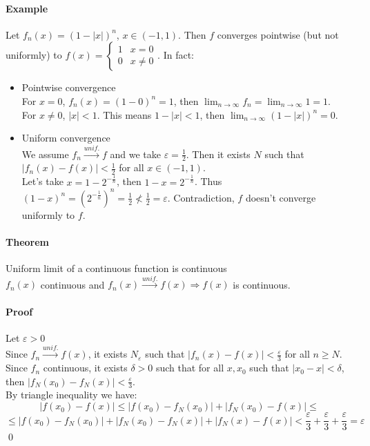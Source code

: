\documentclass{article}
\newcommand{\DS}{\displaystyle}
\newcommand{\abs}[1]{\left|#1\right|}
\newcommand{\limn}{\lim_{n \to \infty}}
\newcommand{\tounif}{\xrightarrow{unif.}}
\newcommand{\intoo}[1]{\left(#1\right)}
\newcommand{\Ep}{\varepsilon}
\newcommand{\Theorem}{\paragraph{Theorem}}
\newcommand{\Proof}{\paragraph{Proof}}
\newcommand{\Example}{\paragraph{Example}}
\begin{document}
  \Example Let $f_n(x) = (1 - \abs{x})^n$, $x \in \intoo{-1,1}$. Then $f$
  converges pointwise (but not uniformly) to $f(x) =
  \begin{cases}1 & x = 0 \\ 0 & x \neq 0\end{cases}$. In fact:
\begin{itemize}
  \item Pointwise convergence
\\For $x = 0$, $f_n(x) = (1 - 0)^n = 1$, then $\DS \limn{f_n} = \limn{1} = 1$.
\\For $x \neq 0$, $\abs{x} < 1$. This means $1 - |x| < 1$, then
  $\DS \limn{(1-|x|)^n} = 0$.

  \item Uniform convergence
\\We assume $f_n \tounif f$ and we take $\Ep = \frac{1}{2}$. Then it exists $N$
  such that $\abs{f_n(x) - f(x)} < \frac{1}{2}$ for all $x \in \intoo{-1,1}$.
\\Let's take $x = 1 - 2^{-\frac{1}{n}}$, then $1 - x = 2^{-\frac{1}{n}}$. Thus
  $(1 - x)^n = (2^{-\frac{1}{n}})^n = \frac{1}{2} \nless \frac{1}{2} = \Ep$.
  Contradiction, $f$ doesn't converge uniformly to $f$.
\end{itemize}

  \Theorem Uniform limit of a continuous function is continuous
\\$f_n(x)$ continuous and $f_n(x) \tounif f(x) \Rightarrow f(x)$ is continuous.

  \Proof Let $\Ep > 0$
\\Since $f_n \tounif f(x)$, it exists $N_\Ep$ such that $\abs{f_n(x)-f(x)} <
  \frac{\Ep}{3}$ for all $n \geq N$.
\\Since $f_n$ continuous, it exists $\delta > 0$ such that for all $x,x_0$ such
  that $\abs{x_0 - x} < \delta$, then $\abs{f_N(x_0) - f_N(x)} < \frac{\Ep}{3}$.
\\By triangle inequality we have:
\begin{equation*}
  \abs{f(x_0) - f(x)} \leq \abs{f(x_0) - f_N(x_0)} + \abs{f_N(x_0) - f(x)} \leq
\end{equation*}
\begin{equation*} \leq
  \abs{f(x_0) - f_N(x_0)} + \abs{f_N(x_0) - f_N(x)} + \abs{f_N(x) - f(x)} <
  \frac{\Ep}{3} + \frac{\Ep}{3} + \frac{\Ep}{3} = \Ep
\end{equation*}
  \qed
\end{document}
